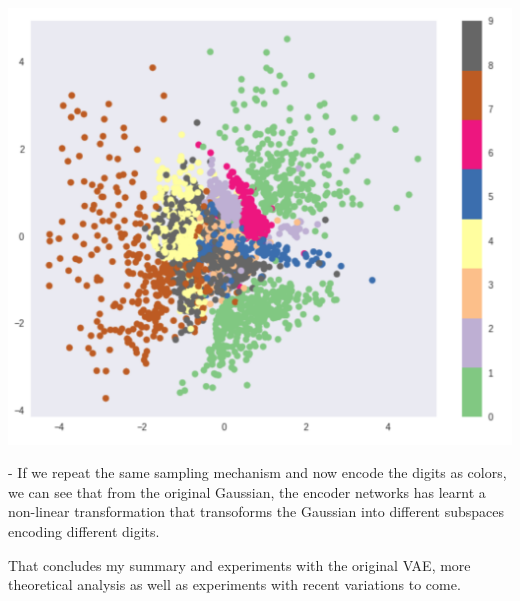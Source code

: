 \documentclass[graybox]{svmult}
\begin{document}
\includegraphics[width=\textwidth]{top_label.png}

- If we repeat the same sampling mechanism and now encode the digits as colors, we can see that from the original Gaussian, the encoder networks has learnt a non-linear transformation that transoforms the Gaussian into different subspaces encoding different digits.

That concludes my summary and experiments with the original VAE, more theoretical analysis as well as experiments with recent variations to come.
\end{document}
